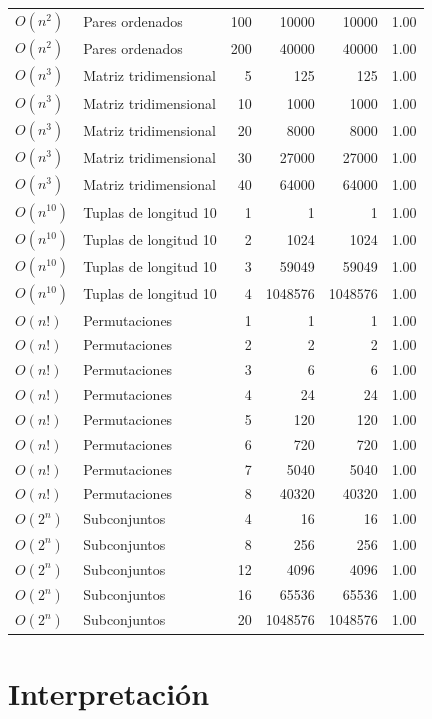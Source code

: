 \documentclass[12pt,letterpaper]{article}
\begin{document}
\begin{longtable}{p{} p{} r r r r}
$O(n^2)$ & Pares ordenados & 100 & 10000 & 10000 & 1.00 \\
$O(n^2)$ & Pares ordenados & 200 & 40000 & 40000 & 1.00 \\
$O(n^3)$ & Matriz tridimensional & 5 & 125 & 125 & 1.00 \\
$O(n^3)$ & Matriz tridimensional & 10 & 1000 & 1000 & 1.00 \\
$O(n^3)$ & Matriz tridimensional & 20 & 8000 & 8000 & 1.00 \\
$O(n^3)$ & Matriz tridimensional & 30 & 27000 & 27000 & 1.00 \\
$O(n^3)$ & Matriz tridimensional & 40 & 64000 & 64000 & 1.00 \\
$O(n^{10})$ & Tuplas de longitud 10 & 1 & 1 & 1 & 1.00 \\
$O(n^{10})$ & Tuplas de longitud 10 & 2 & 1024 & 1024 & 1.00 \\
$O(n^{10})$ & Tuplas de longitud 10 & 3 & 59049 & 59049 & 1.00 \\
$O(n^{10})$ & Tuplas de longitud 10 & 4 & 1048576 & 1048576 & 1.00 \\
$O(n!)$ & Permutaciones & 1 & 1 & 1 & 1.00 \\
$O(n!)$ & Permutaciones & 2 & 2 & 2 & 1.00 \\
$O(n!)$ & Permutaciones & 3 & 6 & 6 & 1.00 \\
$O(n!)$ & Permutaciones & 4 & 24 & 24 & 1.00 \\
$O(n!)$ & Permutaciones & 5 & 120 & 120 & 1.00 \\
$O(n!)$ & Permutaciones & 6 & 720 & 720 & 1.00 \\
$O(n!)$ & Permutaciones & 7 & 5040 & 5040 & 1.00 \\
$O(n!)$ & Permutaciones & 8 & 40320 & 40320 & 1.00 \\
$O(2^n)$ & Subconjuntos & 4 & 16 & 16 & 1.00 \\
$O(2^n)$ & Subconjuntos & 8 & 256 & 256 & 1.00 \\
$O(2^n)$ & Subconjuntos & 12 & 4096 & 4096 & 1.00 \\
$O(2^n)$ & Subconjuntos & 16 & 65536 & 65536 & 1.00 \\
$O(2^n)$ & Subconjuntos & 20 & 1048576 & 1048576 & 1.00 \\
\bottomrule
\end{longtable}

\section{Interpretación}
\end{document}
